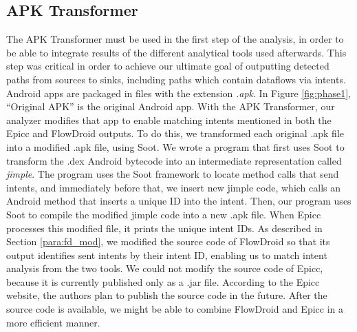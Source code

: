 {\subsection{APK Transformer} \label{para:apk-transformer}
The APK Transformer must be used in the first step of the analysis, in order to be able to integrate results of the different analytical tools used afterwards. This step was critical in order to achieve our ultimate goal of outputting detected paths from sources to sinks, including paths which contain dataflows via intents.
Android apps are packaged in files with the extension {\em.apk}. 
In Figure \ref{fig:phase1}, ``Original APK'' is the original Android app. With the APK Transformer, our analyzer modifies that app to enable matching intents mentioned in both the Epicc and FlowDroid outputs. 
To do this, we transformed each original .apk file into a modified
.apk file, using Soot. 
We wrote a program that first uses Soot to transform the .dex Android
bytecode into an intermediate representation called {\em jimple}. The
program uses the Soot framework to locate method calls that send
intents, and immediately before that, we insert new jimple code, which
calls an Android method that inserts a unique ID into the
intent. Then, our program uses Soot to compile the modified jimple
code into a new .apk file. When Epicc processes this modified file, it
prints the unique intent IDs.  
As described
in Section \ref{para:fd_mod}, we modified the source code of FlowDroid
so that its output identifies sent intents by their intent ID,
enabling us to match
intent analysis from the two tools. We could not modify the source code of Epicc, because it is currently
published only as a .jar file. 
According to the Epicc website, the authors plan to publish
the source code in the future. 
After the source code is available, we might be able to combine FlowDroid and
Epicc in a more efficient manner.




}
